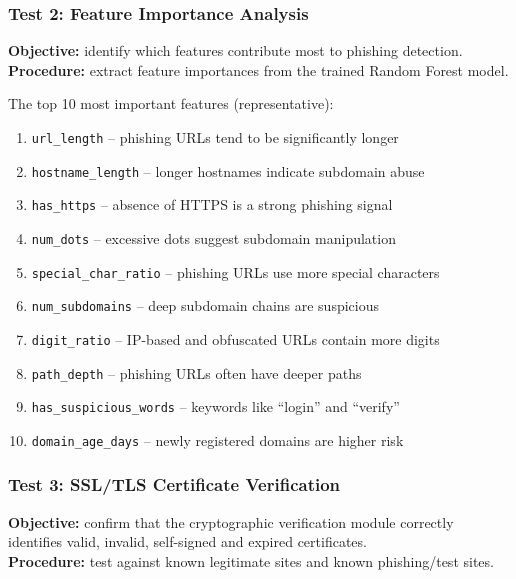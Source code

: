 \documentclass[11pt,a4paper]{article}
\begin{document}
\subsubsection{Test 2: Feature Importance Analysis}

\textbf{Objective:} identify which features contribute most to phishing detection.\\
\textbf{Procedure:} extract feature importances from the trained Random Forest model.

The top 10 most important features (representative):
\begin{enumerate}
  \item \texttt{url\_length} -- phishing URLs tend to be significantly longer
  \item \texttt{hostname\_length} -- longer hostnames indicate subdomain abuse
  \item \texttt{has\_https} -- absence of HTTPS is a strong phishing signal
  \item \texttt{num\_dots} -- excessive dots suggest subdomain manipulation
  \item \texttt{special\_char\_ratio} -- phishing URLs use more special characters
  \item \texttt{num\_subdomains} -- deep subdomain chains are suspicious
  \item \texttt{digit\_ratio} -- IP-based and obfuscated URLs contain more digits
  \item \texttt{path\_depth} -- phishing URLs often have deeper paths
  \item \texttt{has\_suspicious\_words} -- keywords like ``login'' and ``verify''
  \item \texttt{domain\_age\_days} -- newly registered domains are higher risk
\end{enumerate}

\subsubsection{Test 3: SSL/TLS Certificate Verification}

\textbf{Objective:} confirm that the cryptographic verification module correctly identifies valid, invalid, self-signed and expired certificates.\\
\textbf{Procedure:} test against known legitimate sites and known phishing/test sites.
\end{document}
